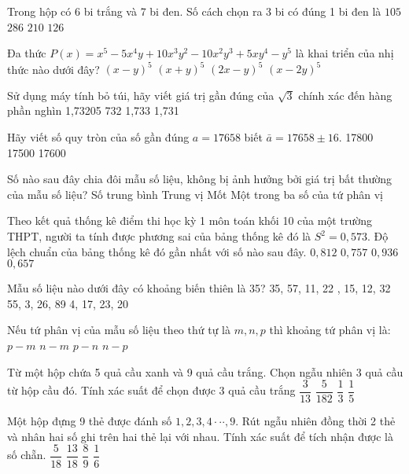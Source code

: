 \begin{ex}
Trong hộp có 6 bi trắng và 7 bi đen. Số cách chọn ra 3 bi có đúng 1 bi đen là
\choice
{\True $105$}
{$286$}
{$210$}
{$126$}
\end{ex}
\begin{ex}
Đa thức $P(x)=x^5-5x^4y+10x^3y^2-10x^2y^3+5xy^4-y^5$ là khai triển của nhị thức nào dưới đây?
\choice
{\True $(x-y)^5$}
{${{(x+y)}^5}$}
{${{(2x-y)}^5}$}
{${{(x-2y)}^5}$}
\end{ex}
\begin{ex}
Sử dụng máy tính bỏ túi, hãy viết giá trị gần đúng của $\sqrt{3}$ chính xác đến hàng phần nghìn
\choice
{1{,}73205}
{732}
{1{,}733}
{1{,}731}
\end{ex}
\begin{ex}
Hãy viết số quy tròn của số gần đúng $a=17658$ biết $\bar{a}=17658\pm 16$.
\choice
{}
{17800}
{17500}
{17600}
\end{ex}
\begin{ex}
Số nào sau đây chia đôi mẫu số liệu, không bị ảnh hưởng bởi giá trị bất thường của mẫu số liệu?
\choice
{Số trung bình}
{\True Trung vị}
{Mốt}
{Một trong ba số của tứ phân vị}
\end{ex}
\begin{ex}
Theo kết quả thống kê điểm thi học kỳ 1 môn toán khối 10 của một trường THPT, người ta tính được phương sai của bảng thống kê đó là $S^2=0{,}573$. Độ lệch chuẩn của bảng thống kê đó gần nhất với số nào sau đây.
\choice
{$0{,}812$}
{\True $0{,}757$}
{$0{,}936$}
{$0{,}657$}
\end{ex}
\begin{ex}
Mẫu số liệu nào dưới đây có khoảng biến thiên là 35?
\choice
{35, 57, 11, 22}
{, 15, 12, 32}
{55, 3, 26, 89}
{4, 17, 23, 20}
\end{ex}
\begin{ex}
Nếu tứ phân vị của mẫu số liệu theo thứ tự là ${m, n, p}$ thì khoảng tứ phân vị là:
\choice
{\True ${p-m}$}
{${n-m}$}
{${p-n}$}
{${n-p}$}
\end{ex}
\begin{ex}
Từ một hộp chứa 5 quả cầu xanh và 9 quả cầu trắng. Chọn ngẫu nhiên 3 quả cầu từ hộp cầu đó. Tính xác suất để chọn được 3 quả cầu trắng
\choice
{\True $\dfrac{3}{13}$}
{$\dfrac{5}{182}$}
{$\dfrac{1}{3}$}
{$\dfrac{1}{5}$}
\end{ex}
\begin{ex}
Một hộp đựng 9 thẻ được đánh số $1{,}2,3{,}4 \cdot \cdot \cdot ,9$. Rút ngẫu nhiên đồng thời 2 thẻ và nhân hai số ghi trên hai thẻ lại với nhau. Tính xác suất để tích nhận được là số chẵn.
\choice
{$\dfrac{5}{18}$}
{\True $\dfrac{13}{18}$}
{$\dfrac{8}{9}$}
{$\dfrac{1}{6}$}
\end{ex}

